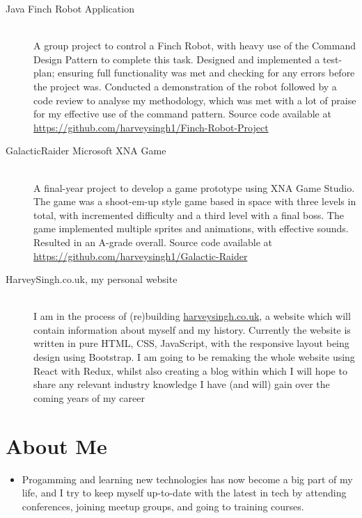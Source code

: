 \documentclass[a4paper,10pt]{extarticle} %
\begin{document}
{\begin{description}
\item[Java Finch Robot Application]\hfill \\
A group project to control a Finch Robot, with heavy use of the Command Design Pattern to complete this task. Designed and implemented a test-plan; ensuring full functionality was met and checking for any errors before the project was. Conducted a demonstration of the robot followed by a code review to analyse my methodology, which was met with a lot of praise for my effective use of the command pattern. Source code available at \href{https://github.com/harveysingh1/Finch-Robot-Project}{https://github.com/harveysingh1/Finch-Robot-Project}

\item[GalacticRaider Microsoft XNA Game]\hfill \\
A final-year project to develop a game prototype using XNA Game Studio. The game was a shoot-em-up style game based in space with three levels in total, with incremented difficulty and a third level with a final boss. The game implemented multiple sprites and animations, with effective sounds. Resulted in an A-grade overall. Source code available at \href{https://github.com/harveysingh1/Galactic-Raider}{https://github.com/harveysingh1/Galactic-Raider}

\item[HarveySingh.co.uk, my personal website]\hfill \\
I am in the process of (re)building \href{harveysingh.co.uk}{harveysingh.co.uk}, a website which will contain information about myself and my history. Currently the website is written in pure HTML, CSS, JavaScript, with the responsive layout being design using Bootstrap. I am going to be remaking the whole website using React with Redux, whilst also creating a blog within which I will hope to share any relevant industry knowledge I have (and will) gain over the coming years of my career

\end{description}


\section{\textcolor{primary}{About Me}}

\begin{itemize}
\vspace{0.2cm}
\item Progamming and learning new technologies has now become a big part of my life, and I try to keep myself up-to-date with the latest in tech by attending conferences, joining meetup groups, and going to training courses.


\end{itemize}}
\end{document}
